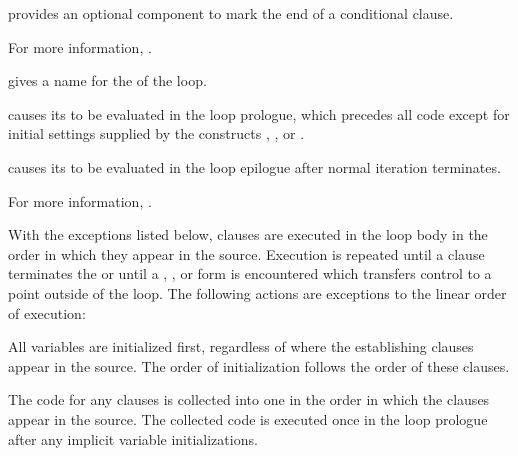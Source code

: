  provides an optional component to mark the
end of a conditional clause.
 
For more information, \seesection\LOOPConditional.

\endsubsubsubsection%

 
 gives a name for the  of the loop.

 causes its  to be
evaluated in the loop prologue, which precedes all  code
except for initial settings supplied by the constructs ,
, or .
 
 causes its  to
be evaluated in the loop epilogue after normal iteration terminates.

For more information, \seesection\LOOPMisc.

\endsubsubsubsection%

\endsubsubsection%


 
  With the exceptions listed below, clauses are executed in the loop body
  in the order in which they appear in the source.  Execution is repeated 
  until a clause
  terminates the  or until a , ,
  or  form is encountered 
which transfers control to a point outside of the loop.
 The following actions are
  exceptions to the linear order of execution:
 
\beginlist

\itemitem{\bull}  All variables are initialized first, 
  regardless of where the establishing clauses appear in the
  source.  The order of initialization follows the order of these clauses.
                                    
\itemitem{\bull}  The code for any  clauses is collected
  into one  in the order in which the clauses appear in
  the source.  The collected code is executed once in the loop prologue
  after any implicit variable initializations.
 
